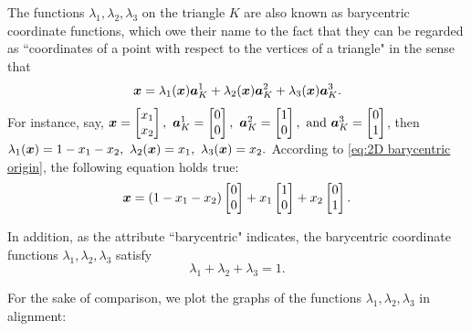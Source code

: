 	The functions $\lambda_1,\lambda_2,\lambda_3$ on the triangle $K$ are 
	also known as barycentric coordinate functions, which owe their name
	to the fact that they can be regarded as ``coordinates of a point with 
	respect to the vertices of a triangle" in the sense that
	\begin{equation}\label{eq:2D barycentric origin}
	 	\bm{x}=\lambda_1(\bm{x})\bm{a}_K^1+\lambda_2(\bm{x})\bm{a}_K^2+\lambda_3(\bm{x})\bm{a}_K^3.
	\end{equation}
	For instance, say, $
	\bx=\begin{bmatrix}x_1\\x_2\end{bmatrix},\ 
	\ba_K^1=\begin{bmatrix}0\\0\end{bmatrix},\ 
	\ba_K^2=\begin{bmatrix}1\\0\end{bmatrix},\ \textrm{and }
	\ba_K^3=\begin{bmatrix}0\\1\end{bmatrix}$, then
	$ \lambda_1(\bx)=1-x_1-x_2,\ 
	  \lambda_2(\bx)=x_1,\ 
	  \lambda_3(\bx)=x_2.$
	According to \eqref{eq:2D barycentric origin}, the following equation 
	holds true:	
	\[\bm{x}=(1-x_1-x_2)\begin{bmatrix}0\\0\end{bmatrix}+
	 x_1\begin{bmatrix}1\\0\end{bmatrix}+
	 x_2\begin{bmatrix}0\\1\end{bmatrix}. \]
	
	In addition, as the attribute ``barycentric" indicates, the barycentric 
	coordinate functions $\lambda_1,\lambda_2,\lambda_3$ satisfy
	\[ \lambda_1+\lambda_2+\lambda_3=1. \]
	
	For the sake of comparison, we plot the graphs of the
	functions $\lambda_1,\lambda_2,\lambda_3$ in alignment:\vspace{-8pt}
	\begin{figure}[!htbp]
	\makebox[\textwidth][c]{
		\subfloat{}
		\hspace{5pt}
		\subfloat{}
		\hspace{5pt}
		\subfloat{}
	}
	\end{figure}
	
